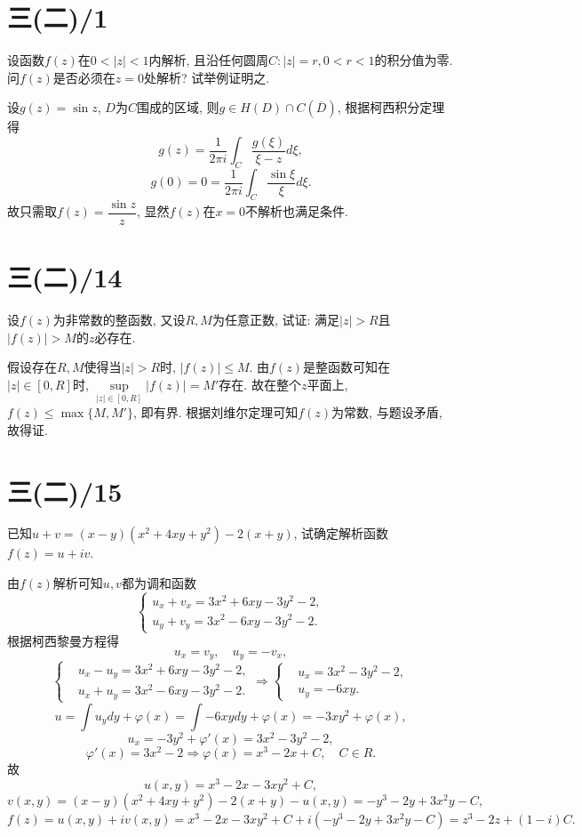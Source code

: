 \documentclass[11pt,a4paper]{article}
\begin{document}
\section{三(二)/1}
\begin{problem}
设函数$f(z)$在$0<|z|<1$内解析, 且沿任何圆周$C:|z|=r,0<r<1$的积分值为零. 问$f(z)$是否必须在$z=0$处解析? 试举例证明之.
\end{problem}

设$g(z)=\sin z$, $D$为$C$围成的区域, 则$g\in H(D)\cap C(\overline{D})$, 根据柯西积分定理得
$$g(z)=\frac{1}{2\pi i}\int_C\frac{g(\xi)}{\xi-z}d\xi,$$
$$g(0)=0=\frac{1}{2\pi i}\int_C\frac{\sin\xi}{\xi}d\xi.$$
故只需取$f(z)=\dfrac{\sin z}{z}$, 显然$f(z)$在$x=0$不解析也满足条件.

\section{三(二)/14}
\begin{problem}
设$f(z)$为非常数的整函数, 又设$R,M$为任意正数, 试证: 满足$|z|>R$且$|f(z)|>M$的$z$必存在.
\end{problem}
假设存在$R,M$使得当$|z|>R$时, $|f(z)|\leqslant M$. 由$f(z)$是整函数可知在$|z|\in[0,R]$时, $\sup\limits_{|z|\in[0,R]}|f(z)|=M'$存在. 故在整个$z$平面上, $f(z)\leqslant\max\{M,M'\}$, 即有界. 根据刘维尔定理可知$f(z)$为常数, 与题设矛盾, 故得证.

\section{三(二)/15}
\begin{problem}
已知$u+v=(x-y)(x^2+4xy+y^2)-2(x+y)$, 试确定解析函数$f(z)=u+iv$.
\end{problem}
由$f(z)$解析可知$u,v$都为调和函数
$$\left\{\begin{aligned}u_x+v_x=3 x^2+6 x y-3 y^2-2, \\
    u_y+v_y=3 x^2-6 x y-3 y^2-2.\end{aligned}\right.$$
根据柯西黎曼方程得
$$u_x=v_y,\quad u_y=-v_x,$$
$$\left\{\begin{aligned}
     & u_x-u_y=3 x^2+6 x y-3 y^2-2, \\
     & u_x+u_y=3 x^2-6 x y-3 y^2-2.
  \end{aligned}\right.\Longrightarrow\left\{\begin{aligned}
     & u_x=3x^2-3y^2-2, \\
     & u_y=-6xy.
  \end{aligned}\right.$$
$$u=\int u_ydy+\varphi(x)=\int-6xydy+\varphi(x)=-3xy^2+\varphi(x),$$
$$u_x=-3y^2+\varphi'(x)=3x^2-3y^2-2,$$
$$\varphi'(x)=3x^2-2\Longrightarrow \varphi(x)=x^3-2x+C,\quad C\in R.$$
故
$$u(x,y)=x^3-2x-3xy^2+C,$$
$$v(x,y)=(x-y)(x^2+4xy+y^2)-2(x+y)-u(x,y)=-y^3-2y+3x^2y-C,$$
$$f(z)=u(x,y)+iv(x,y)=x^3-2x-3xy^2+C+i(-y^3-2y+3x^2y-C)=z^3-2z+(1-i)C.$$
\end{document}
